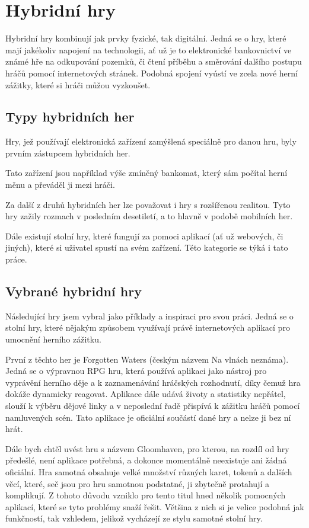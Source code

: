 \chapter{Hybridní hry}
Hybridní hry kombinují jak prvky fyzické, tak digitální. Jedná se o hry, které mají jakékoliv napojení na technologii, ať už je to elektronické bankovnictví ve známé hře na odkupování pozemků, či čtení příběhu a směrování dalšího postupu hráčů pomocí internetových stránek. Podobná spojení vyústí ve zcela nové herní zážitky, které si hráči můžou vyzkoušet.

\section{Typy hybridních her}
Hry, jež používají elektronická zařízení zamýšlená speciálně pro danou hru, byly prvním zástupcem hybridních her.

Tato zařízení jsou například výše zmíněný bankomat, který sám počítal herní měnu a převáděl ji mezi hráči.

Za další z druhů hybridních her lze považovat i hry s rozšířenou realitou. Tyto hry zažily rozmach v posledním desetiletí, a to hlavně v podobě mobilních her.

Dále existují stolní hry, které fungují za pomoci aplikací (ať už webových, či jiných), které si uživatel spustí na svém zařízení. Této kategorie se týká i tato práce.

\section{Vybrané hybridní hry}
Následující hry jsem vybral jako příklady a inspiraci pro svou práci. Jedná se o stolní hry, které nějakým způsobem využívají právě internetových aplikací pro umocnění herního zážitku.

První z těchto her je Forgotten Waters (českým názvem Na vlnách neznáma). Jedná se o výpravnou RPG hru, která používá aplikaci jako nástroj pro vyprávění herního děje a k zaznamenávání hráčských rozhodnutí, díky čemuž hra dokáže dynamicky reagovat. Aplikace dále udává životy a statistiky nepřátel, slouží k výběru dějové linky a v neposlední řadě přispívá k zážitku hráčů pomocí namluvených scén. Tato aplikace je oficiální součástí dané hry a nelze ji bez ní hrát.

Dále bych chtěl uvést hru s názvem Gloomhaven, pro kterou, na rozdíl od hry předešlé, není aplikace potřebná, a dokonce momentálně neexistuje ani žádná oficiální. Hra samotná obsahuje velké množství různých karet, tokenů a dalších věcí, které, seč jsou pro hru samotnou podstatné, ji zbytečně protahují a komplikují. Z tohoto důvodu vzniklo pro tento titul hned několik pomocných aplikací, které se tyto problémy snaží řešit. Většina z nich si je velice podobná jak funkčností, tak vzhledem, jelikož vycházejí ze stylu samotné stolní hry.